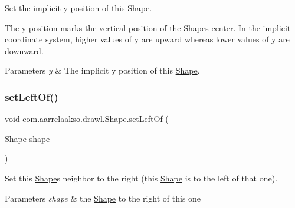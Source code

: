 Set the implicit y position of this \hyperlink{classcom_1_1aarrelaakso_1_1drawl_1_1_shape}{Shape}. 

The y position marks the vertical position of the \hyperlink{classcom_1_1aarrelaakso_1_1drawl_1_1_shape}{Shape}\textquotesingle{}s center. In the implicit coordinate system, higher values of y are upward whereas lower values of y are downward.


\begin{DoxyParams}{Parameters}
{\em y} & The implicit y position of this \hyperlink{classcom_1_1aarrelaakso_1_1drawl_1_1_shape}{Shape}. \\
\hline
\end{DoxyParams}
\mbox{\label{classcom_1_1aarrelaakso_1_1drawl_1_1_shape_aad14fa860ab74cfa90815f56cf4c3ecf}} 
\subsubsection{\texorpdfstring{set\+Left\+Of()}{setLeftOf()}}
{\footnotesize\ttfamily void com.\+aarrelaakso.\+drawl.\+Shape.\+set\+Left\+Of (\begin{DoxyParamCaption}\item[{\hyperlink{classcom_1_1aarrelaakso_1_1drawl_1_1_shape}{Shape}}]{shape }\end{DoxyParamCaption})\hspace{0.3cm}{\ttfamily [inherited]}}



Set this \hyperlink{classcom_1_1aarrelaakso_1_1drawl_1_1_shape}{Shape}\textquotesingle{}s neighbor to the right (this \hyperlink{classcom_1_1aarrelaakso_1_1drawl_1_1_shape}{Shape} is to the left of that one). 


\begin{DoxyParams}{Parameters}
{\em shape} & the \hyperlink{classcom_1_1aarrelaakso_1_1drawl_1_1_shape}{Shape} to the right of this one \\
\hline
\end{DoxyParams}
\mbox{\label{classcom_1_1aarrelaakso_1_1drawl_1_1_shape_a09e1586ce85c1d964cc3b7ce94bc5d4c}} 
